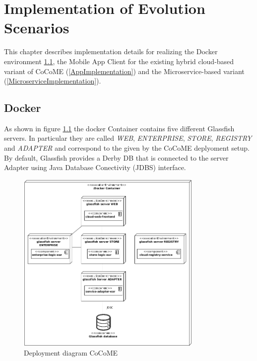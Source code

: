 \chapter{Implementation of Evolution Scenarios}
This chapter describes implementation details for realizing the Docker environment \ref{DockerImplementation}, the Mobile App Client  for the existing hybrid cloud-based variant of CoCoME (\ref{AppImplementation}) and the Microservice-based variant (\ref{MicroserviceImplementation}).


\section{Docker}\label{DockerImplementation}
 	As shown in figure \ref*{Deploym_CoCoME} the docker Container contains five different Glassfish servers. In particular they are called \textit{WEB}, \textit{ENTERPRISE}, \textit{STORE}, \textit{REGISTRY} and \textit{ADAPTER} and correspond to the given by the CoCoME deplyoment setup. By default, Glassfish provides a Derby DB that is connected to the server Adapter using Java Database Conectivity (JDBS) interface.\\
 	\begin{figure}[h]
 		\centering
 		\includegraphics[width = 0.8\textwidth]{img/docker_Container_Deployment.png}
 		\caption{Deployment diagram CoCoME}
 		\label{Deploym_CoCoME}
 	\end{figure}
 	
